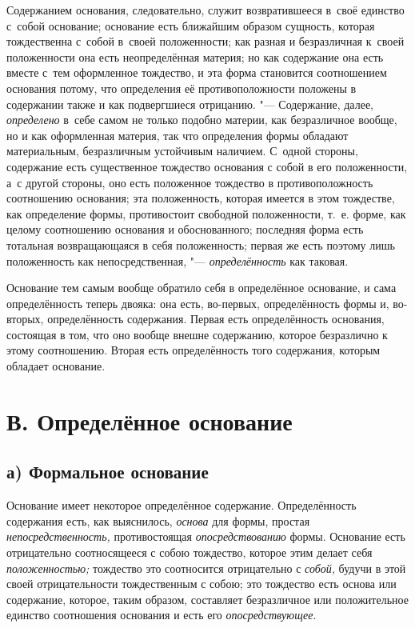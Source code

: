 Содержанием основания, следовательно, служит возвратившееся в~своё единство
с~собой основание; основание есть ближайшим образом сущность, которая
тождественна с~собой в~своей положенности; как разная и безразличная к~своей
положенности она есть неопределённая материя; но как содержание она есть вместе
с~тем оформленное тождество, и эта форма становится соотношением основания
потому, что определения её противоположности положены в содержании также и как
подвергшиеся отрицанию. "--- Содержание, далее, {\em определено} в~себе самом
не только подобно материи, как безразличное вообще, но и как оформленная
материя, так что определения формы обладают материальным, безразличным
устойчивым наличием. С~одной стороны, содержание есть существенное тождество
основания с собой в его положенности, а~с другой стороны, оно есть положенное
тождество в противоположность соотношению основания; эта положенность, которая
имеется в этом тождестве, как определение формы, противостоит свободной
положенности, т.~е. форме, как целому соотношению основания и обоснованного;
последняя форма есть тотальная возвращающаяся в себя положенность; первая же
есть поэтому лишь положенность как непосредственная, "--- {\em определённость}
как таковая.

Основание тем самым вообще обратило себя в определённое основание, и сама
определённость теперь двояка: она есть, во-первых, определённость формы и,
во-вторых, определённость содержания. Первая есть определённость основания,
состоящая в том, что оно вообще внешне содержанию, которое безразлично к
этому соотношению. Вторая есть определённость того содержания, которым
обладает основание.


\section[В. Определённое основание]{В. Определённое основание}

\subsection[а) Формальное основание]{а) Формальное основание}

Основание имеет некоторое определённое содержание. Определённость содержания
есть, как выяснилось, {\em основа} для формы, простая {\em непосредственность,}
противостоящая {\em опосредствованию} формы. Основание есть отрицательно
соотносящееся с собою тождество, которое этим делает себя {\em положенностью;}
тождество это соотносится отрицательно с {\em собой,} будучи в этой своей
отрицательности тождественным с собою; это тождество есть основа или
содержание, которое, таким образом, составляет безразличное или положительное
единство соотношения основания и есть его {\em опосредствующее}.

